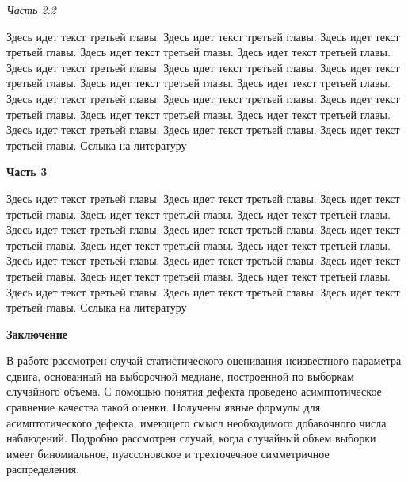\documentclass[a4paper,twoside]{article}
\newcommand{\header}[1]{\bigskip\medskip\noindent\textbf{#1}\nopagebreak\bigskip}
\newcommand{\subheader}[1]{\bigskip\medskip\noindent\emph{#1}\nopagebreak\bigskip}
\theoremstyle{theorem}
\theoremstyle{remark}
\begin{document}
\subheader{Часть 2.2}

Здесь идет текст третьей главы. Здесь идет текст третьей главы. Здесь идет текст третьей главы.
Здесь идет текст третьей главы. Здесь идет текст третьей главы. Здесь идет текст третьей главы.
Здесь идет текст третьей главы. Здесь идет текст третьей главы. Здесь идет текст третьей главы.
Здесь идет текст третьей главы. Здесь идет текст третьей главы. Здесь идет текст третьей главы.
Здесь идет текст третьей главы. Здесь идет текст третьей главы. Здесь идет текст третьей главы.
Здесь идет текст третьей главы. Здесь идет текст третьей главы. Здесь идет текст третьей главы.
Сслыка на литературу \cite{author:ref3}

\header{Часть 3}

Здесь идет текст третьей главы. Здесь идет текст третьей главы. Здесь идет текст третьей главы.
Здесь идет текст третьей главы. Здесь идет текст третьей главы. Здесь идет текст третьей главы.
Здесь идет текст третьей главы. Здесь идет текст третьей главы. Здесь идет текст третьей главы.
Здесь идет текст третьей главы. Здесь идет текст третьей главы. Здесь идет текст третьей главы.
Здесь идет текст третьей главы. Здесь идет текст третьей главы. Здесь идет текст третьей главы.
Здесь идет текст третьей главы. Здесь идет текст третьей главы. Здесь идет текст третьей главы.
Сслыка на литературу \cite{author:ref3}

\header{Заключение}

В работе рассмотрен случай статистического оценивания неизвестного параметра сдвига, основанный на выборочной медиане, построенной по выборкам случайного объема. С помощью понятия дефекта проведено асимптотическое сравнение качества такой оценки. Получены явные формулы для асимптотического дефекта, имеющего смысл необходимого добавочного числа наблюдений. Подробно рассмотрен случай, когда случайный объем выборки имеет биномиальное, пуассоновское и трехточечное симметричное распределения.
\end{document}
